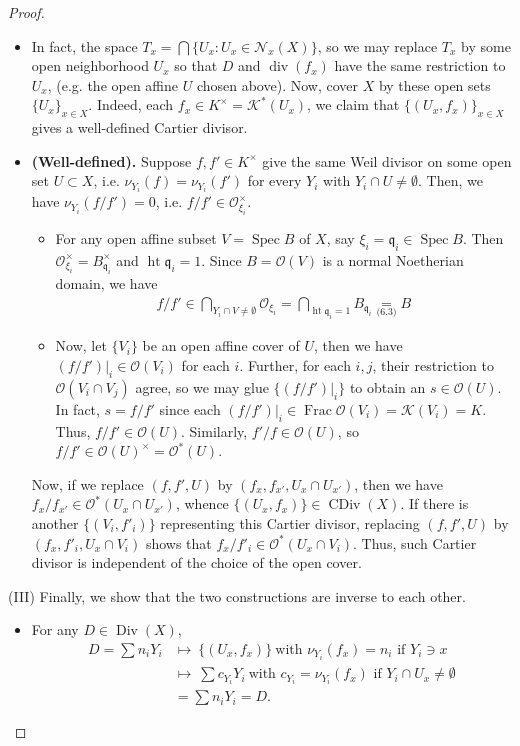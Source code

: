 \documentclass[11pt,a4paper,footinclude=true,headinclude=true]{scrbook} %
\DeclareMathOperator{\Spec}{Spec}
\DeclareMathOperator{\Ht}{ht}
\DeclareMathOperator{\Frac}{Frac}
\DeclareMathOperator{\CDiv}{CDiv}
\DeclareMathOperator{\Div}{Div}
\DeclareMathOperator{\dv}{div}
\newcommand{\KK}{\mathscr{K}}
\newcommand{\NN}{\mathcal{N}}
\newcommand{\OO}{\mathcal{O}}
\newcommand{\qq}{\mathfrak{q}}
\newcommand{\<}{\langle}
\newcommand{\>}{\rangle}
\begin{document}
\begin{proof}
\begin{itemize}
        \item In fact, the space $T_x=\bigcap\{U_x:U_x\in\NN_x(X)\}$, so we may replace $T_x$ by some open neighborhood $U_x$ so that $D$ and $\dv(f_x)$ have the same restriction to $U_x$, (e.g. the open affine $U$ chosen above). Now, cover $X$ by these open sets $\{U_x\}_{x\in X}$. Indeed, each $f_x\in K^\times=\KK^\ast(U_x)$, we claim that $\{(U_x,f_x)\}_{x\in X}$ gives a well-defined Cartier divisor.
        \item \textbf{(Well-defined).} Suppose $f,f'\in K^\times$ give the same Weil divisor on some open set $U\subset X$, i.e. $\nu_{Y_i}(f)=\nu_{Y_i}(f')$ for every $Y_i$ with $Y_i\cap U\neq\emptyset$. Then, we have $\nu_{Y_i}(f/f')=0$, i.e. $f/f'\in\OO_{\xi_i}^\times$.
        \begin{itemize}
            \item For any open affine subset $V=\Spec B$ of $X$, say $\xi_i=\qq_i\in\Spec B$. Then $\OO_{\xi_i}^\times=B_{\qq_i}^\times$ and $\Ht\qq_i=1$. Since $B=\OO(V)$ is a normal Noetherian domain, we have
            \begin{align*}
                f/f'\in\bigcap_{Y_i\cap V\neq\emptyset}\OO_{\xi_i}=\bigcap_{\Ht\qq_i=1}B_{\qq_i}\underset{\text{(6.3)}}{=}B
            \end{align*}
            \item Now, let $\{V_i\}$ be an open affine cover of $U$, then we have $(f/f')|_i\in\OO(V_i)$ for each $i$. Further, for each $i,j$, their restriction to $\OO(V_i\cap V_j)$ agree, so we may glue $\{(f/f')|_i\}$ to obtain an $s\in\OO(U)$. In fact, $s=f/f'$ since each $(f/f')|_i\in\Frac\OO(V_i)=\KK(V_i)=K$. Thus, $f/f'\in\OO(U)$. Similarly, $f'/f\in\OO(U)$, so $f/f'\in\OO(U)^\times=\OO^\ast(U)$.
        \end{itemize}
        Now, if we replace $(f,f',U)$ by $(f_x,f_{x'},U_x\cap U_{x'})$, then we have $f_x/f_{x'}\in\OO^\ast(U_x\cap U_{x'})$, whence $\{(U_x,f_x)\}\in\CDiv(X)$. If there is another $\{(V_i,f'_i)\}$ representing this Cartier divisor, replacing $(f,f',U)$ by $(f_x,f'_i,U_x\cap V_i)$ shows that $f_x/f'_i\in\OO^\ast(U_x\cap V_i)$. Thus, such Cartier divisor is independent of the choice of the open cover.
    \end{itemize}
    (III) Finally, we show that the two constructions are inverse to each other.
    \begin{itemize}
        \item For any $D\in\Div(X)$,
        \begin{align*}
            D=\sum n_iY_i &\longmapsto\ \{(U_x,f_x)\}\ \text{with $\nu_{Y_i}(f_x)=n_i$ if $Y_i\ni x$}\\ &\longmapsto\ \sum c_{Y_i}Y_i\ \text{with $c_{Y_i}=\nu_{Y_i}(f_x)$ if $Y_i\cap U_x\neq\emptyset$}\\ &=\sum n_iY_i=D.

\end{align*}
\end{itemize}
\end{proof}
\end{document}
